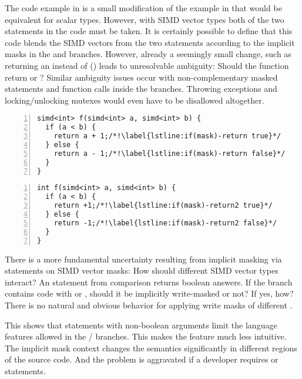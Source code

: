The code example in  is a small modification of the example in  that would be equivalent for scalar types.
However, with \ac{SIMD} vector types both of the two  statements in the code must be taken.
It is certainly possible to define that this code blends the \ac{SIMD} vectors from the two  statements according to the implicit masks in the  and  branches.
However, already a seemingly small change, such as returning an \intt instead of \intv () leads to unresolvable ambiguity:
Should the function return  or ?
Similar ambiguity issues occur with non-complementary masked  statements and function calls inside the branches.
Throwing exceptions and locking/unlocking mutexes would even have to be disallowed altogether.
\begin{lstlisting}[style=Vc,numbers=left,float,label=lst:if(mask)-return,caption={
  Code example that shows unclear return semantics:
  both branches must execute but from where does the function return and what is the return value?
}]
simd<int> f(simd<int> a, simd<int> b) {
  if (a < b) {
    return a + 1;/*!\label{lstline:if(mask)-return true}*/
  } else {
    return a - 1;/*!\label{lstline:if(mask)-return false}*/
  }
}
\end{lstlisting}
\begin{lstlisting}[style=Vc,numbers=left,float,label=lst:if(mask)-return2,caption={
  Code example that shows unresolvable ambiguity:
  both branches must execute but there can be only one return value because the return type is a scalar \intt.
}]
int f(simd<int> a, simd<int> b) {
  if (a < b) {
    return +1;/*!\label{lstline:if(mask)-return2 true}*/
  } else {
    return -1;/*!\label{lstline:if(mask)-return2 false}*/
  }
}
\end{lstlisting}

There is a more fundamental uncertainty resulting from implicit masking via  statements on \ac{SIMD} vector masks:
How should different \ac{SIMD} vector types interact?
An  statement from \intv comparison returns  boolean answers.
If the branch contains code with \shortv or \doublev, should it be implicitly write-masked or not?
If yes, how?
There is no natural and obvious behavior for applying write masks of different .

This shows that  statements with non-boolean arguments limit the language features allowed in the / branches.
This makes the feature much less intuitive.
The implicit mask context changes the semantics significantly in different regions of the source code.
And the problem is aggravated if a developer requires \mbox{} or  statements.

